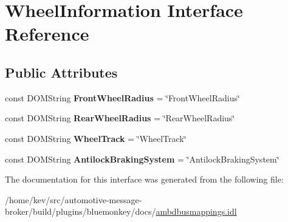 \hypertarget{interfaceWheelInformation}{\section{Wheel\+Information Interface Reference}
\label{interfaceWheelInformation}
}
\subsection*{Public Attributes}
\begin{DoxyCompactItemize}
\item 
\hypertarget{interfaceWheelInformation_abfaf420b0a747f043a8b933af1585a8f}{const D\+O\+M\+String {\bfseries Front\+Wheel\+Radius} = \char`\"{}Front\+Wheel\+Radius\char`\"{}}\label{interfaceWheelInformation_abfaf420b0a747f043a8b933af1585a8f}

\item 
\hypertarget{interfaceWheelInformation_ab5d9a64c7336660a013e85738b2260c6}{const D\+O\+M\+String {\bfseries Rear\+Wheel\+Radius} = \char`\"{}Rear\+Wheel\+Radius\char`\"{}}\label{interfaceWheelInformation_ab5d9a64c7336660a013e85738b2260c6}

\item 
\hypertarget{interfaceWheelInformation_a9b86b0884f24e3fa9d4f81b047dda024}{const D\+O\+M\+String {\bfseries Wheel\+Track} = \char`\"{}Wheel\+Track\char`\"{}}\label{interfaceWheelInformation_a9b86b0884f24e3fa9d4f81b047dda024}

\item 
\hypertarget{interfaceWheelInformation_a4c15409b80fb3b9ab163702d5870594b}{const D\+O\+M\+String {\bfseries Antilock\+Braking\+System} = \char`\"{}Antilock\+Braking\+System\char`\"{}}\label{interfaceWheelInformation_a4c15409b80fb3b9ab163702d5870594b}

\end{DoxyCompactItemize}


The documentation for this interface was generated from the following file\+:\begin{DoxyCompactItemize}
\item 
/home/kev/src/automotive-\/message-\/broker/build/plugins/bluemonkey/docs/\hyperlink{ambdbusmappings_8idl}{ambdbusmappings.\+idl}\end{DoxyCompactItemize}
